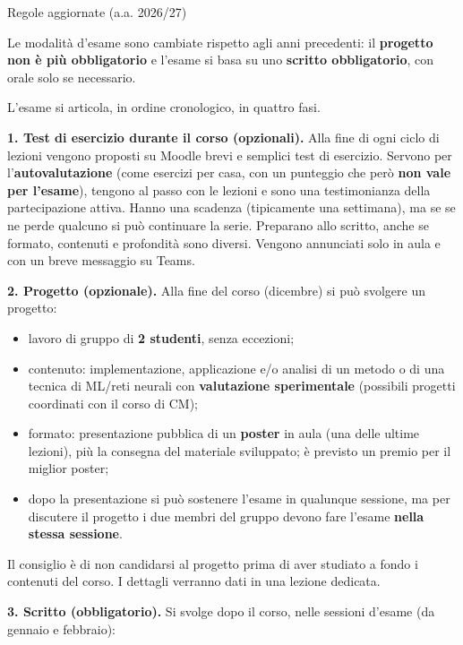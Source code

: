 \begin{boxwarning}{Regole aggiornate (a.a. 2026/27)}

Le modalità d'esame sono cambiate rispetto agli anni precedenti: il
\textbf{progetto non è più obbligatorio} e l'esame si basa su uno
\textbf{scritto obbligatorio}, con orale solo se necessario.

\end{boxwarning}

L'esame si articola, in ordine cronologico, in quattro fasi.

\textbf{1. Test di esercizio durante il corso (opzionali).} Alla fine di
ogni ciclo di lezioni vengono proposti su Moodle brevi e semplici test
di esercizio. Servono per l'\textbf{autovalutazione} (come esercizi per
casa, con un punteggio che però \textbf{non vale per l'esame}), tengono
al passo con le lezioni e sono una testimonianza della partecipazione
attiva. Hanno una scadenza (tipicamente una settimana), ma se se ne
perde qualcuno si può continuare la serie. Preparano allo scritto, anche
se formato, contenuti e profondità sono diversi. Vengono annunciati solo
in aula e con un breve messaggio su Teams.

\textbf{2. Progetto (opzionale).} Alla fine del corso (dicembre) si può
svolgere un progetto:

\begin{itemize}
\tightlist
\item
  lavoro di gruppo di \textbf{2 studenti}, senza eccezioni;
\item
  contenuto: implementazione, applicazione e/o analisi di un metodo o di
  una tecnica di ML/reti neurali con \textbf{valutazione sperimentale}
  (possibili progetti coordinati con il corso di CM);
\item
  formato: presentazione pubblica di un \textbf{poster} in aula (una
  delle ultime lezioni), più la consegna del materiale sviluppato; è
  previsto un premio per il miglior poster;
\item
  dopo la presentazione si può sostenere l'esame in qualunque sessione,
  ma per discutere il progetto i due membri del gruppo devono fare
  l'esame \textbf{nella stessa sessione}.
\end{itemize}

Il consiglio è di non candidarsi al progetto prima di aver studiato a
fondo i contenuti del corso. I dettagli verranno dati in una lezione
dedicata.

\textbf{3. Scritto (obbligatorio).} Si svolge dopo il corso, nelle
sessioni d'esame (da gennaio e febbraio):

